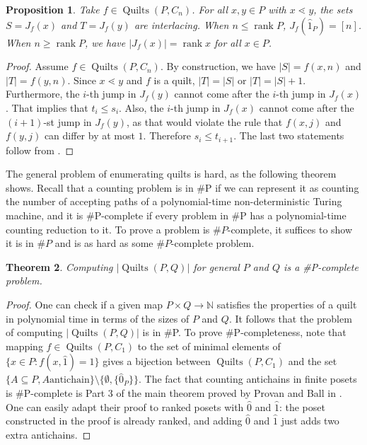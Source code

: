\documentclass[12pt]{amsart}
\newcommand{\N}{{\mathbb N}}
\numberwithin{equation}{section}
\newtheorem{theorem}{Theorem}[section]
\newtheorem{prop}[theorem]{Proposition}
\theoremstyle{definition}
\newcommand{\quilt}{\operatorname{Quilts}}
\newcommand{\rank}{\operatorname{rank}}
\begin{document}
\begin{prop} \label{prop:interlacing}
 Take $f \in \quilt(P,C_n)$. For all $x,y \in P$ with $x \lessdot y$, the sets $S = J_f(x)$ and $T = J_f(y)$ are interlacing. When $n \leq \rank P$, $ J_f(\hat 1_P) = [n]$. When $n \geq \rank P$, we have $|J_{f}(x)| = \rank x$ for all $x \in P$.
\end{prop}

\begin{proof}
Assume $f \in \quilt(P,C_n)$.  By construction, we have $|S| = f(x,n)$
and $|T| = f(y,n)$.  Since $x \lessdot y$ and $f$ is a quilt, $|T| =
|S|$ or $|T| = |S|+1$. Furthermore, the $i$-th jump in $J_{f}(y)$
cannot come after the $i$-th jump in $J_{f}(x)$. That implies that
$t_i \leq s_i$. Also, the $i$-th jump in $J_{f}(x)$ cannot come after
the $(i+1)$-st jump in $J_{f}(y)$, as that would violate the rule that
$f(x,j)$ and $f(y,j)$ can differ by at most $1$. Therefore $s_i \leq
t_{i+1}$. The last two statements follow from
.
\end{proof}

The general problem of enumerating quilts is hard, as the following
theorem shows. Recall that a counting problem is in \#P if we can
represent it as counting the number of accepting paths of a
polynomial-time non-deterministic Turing machine, and it is
\#P-complete if every problem in \#P has a polynomial-time counting
reduction to it.  To prove a problem is $\#P$-complete, it suffices to
show it is in $\#P$ and is as hard as some $\#P$-complete problem.

\begin{theorem} \label{thm:complexity}
 Computing $|\quilt(P,Q)|$ for general $P$ and $Q$ is a \#P-complete problem.
\end{theorem}
\begin{proof}
One can check if a given map $P \times Q \to \N$ satisfies the
properties of a quilt in polynomial time in terms of the sizes of $P$
and $Q$. It follows that the problem
of computing $|\quilt(P,Q)|$ is in \#P. To prove \#P-completeness,
note that mapping $f \in \quilt(P, C_1)$ to the set of minimal
elements of $\{ x \in P \colon f(x,\hat 1) = 1\}$ gives a bijection
between $\quilt(P, C_1)$ and the set $\{A \subseteq P, A \mbox{
antichain}\} \setminus \{\emptyset, \{\hat 0_P\}\}$. The fact that
counting antichains in finite posets is \#P-complete is Part 3 of the
main theorem proved by Provan and Ball in \cite[p. 783]{antichains}. One
can easily adapt their proof to ranked posets with $\hat 0$ and $\hat
1$: the poset constructed in the proof is already ranked, and adding
$\hat 0$ and $\hat 1$ just adds two extra antichains.
\end{proof}
\end{document}
